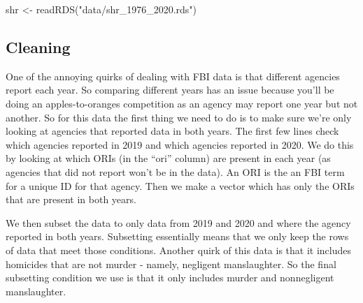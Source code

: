 \documentclass[
]{krantz}
\makeatletter
\newenvironment{Shaded}{\begin{snugshade}}{\end{snugshade}}
\newcommand{\DecValTok}[1]{\textcolor[rgb]{0.06,0.06,0.06}{#1}}
\newcommand{\FunctionTok}[1]{\textcolor[rgb]{0,0,0}{#1}}
\newcommand{\NormalTok}[1]{#1}
\newcommand{\OtherTok}[1]{\textcolor[rgb]{0.37,0.37,0.37}{#1}}
\newcommand{\SpecialCharTok}[1]{\textcolor[rgb]{0,0,0}{#1}}
\newcommand{\StringTok}[1]{\textcolor[rgb]{0.5,0.5,0.5}{#1}}
\newenvironment{kframe}{%
\medskip{}
\setlength{\fboxsep}{.8em}
 \def\at@end@of@kframe{}%
 \ifinner\ifhmode%
  \def\at@end@of@kframe{\end{minipage}}%
  \begin{minipage}{\columnwidth}%
 \fi\fi%
 \def\FrameCommand##1{\hskip\@totalleftmargin \hskip-\fboxsep
 \colorbox{shadecolor}{##1}\hskip-\fboxsep
     \hskip-\linewidth \hskip-\@totalleftmargin \hskip\columnwidth}%
 \MakeFramed {\advance\hsize-\width
   \@totalleftmargin\z@ \linewidth\hsize
   \@setminipage}}%
 {\par\unskip\endMakeFramed%
 \at@end@of@kframe}
\renewenvironment{Shaded}{\begin{kframe}}{\end{kframe}}
\makeatother
\begin{document}
\begin{Shaded}
\begin{Highlighting}[]
\NormalTok{shr }\OtherTok{\textless{}{-}} \FunctionTok{readRDS}\NormalTok{(}\StringTok{"data/shr\_1976\_2020.rds"}\NormalTok{)}
\end{Highlighting}
\end{Shaded}

\hypertarget{cleaning}{%
\subsection{Cleaning}\label{cleaning}}

One of the annoying quirks of dealing with FBI data is that
different agencies report each year. So comparing different
years has an issue because you'll be doing an
apples-to-oranges competition as an agency may report one
year but not another. So for this data the first thing we
need to do is to make sure we're only looking at agencies
that reported data in both years. The first few lines check
which agencies reported in 2019 and which agencies reported
in 2020. We do this by looking at which ORIs (in the ``ori''
column) are present in each year (as agencies that did not
report won't be in the data). An ORI is the an FBI term for
a unique ID for that agency. Then we make a vector which has
only the ORIs that are present in both years.

We then subset the data to only data from 2019 and 2020 and
where the agency reported in both years. Subsetting
essentially means that we only keep the rows of data that
meet those conditions. Another quirk of this data is that it
includes homicides that are not murder - namely, negligent
manslaughter. So the final subsetting condition we use is
that it only includes murder and nonnegligent manslaughter.

\begin{Shaded}
\end{Shaded}
\end{document}
